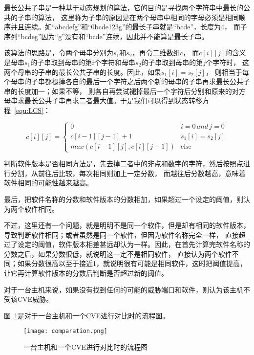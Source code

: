 最长公共子串是一种基于动态规划的算法，它的目的是寻找两个字符串中最长的公共的子串的算法，
这里称为子串的原因是在两个母串中相同的字母必须是相同顺序并且连续。如“abcdefg”和“0bcde123g”的最长子串就是“bcde”，长度为4，
而子序列“bcdeg”因为“g”没有和“bcde”连续，因此并不能算是最长子串。

该算法的思路是，令两个母串分别为$s_1$和$s_2$，再令二维数组$c$，
而$c[i][j]$的含义是母串$s_1$的子串取到母串的第$i$个字符和母串$s_2$的子串取到母串的第$j$个字符时，
这两个母串的子串的最长公共子串的长度。因此，如果$s_1 [i]=s_2 [j]$，
则相当于每个母串的子串都褪掉各自的最后一个字符之后两个新的母串的子串再求最长公共子串的长度加一；如果不等，
则各自再尝试褪掉最后一个字符后分别和原来的对方母串求最长公共子串再求二者最大值。于是我们可以得到状态转移方程~\ref{equ:LCS}：

\begin{equation}
    \label{equ:LCS}
    c[i][j]=\begin{cases}
    0 & i=0 \, and \, j=0 \\
    c[i-1][j-1]+1 & s_1[i]=s_2[j] \\
    max(c[i-1][j], c[i][j-1]) & \text{else}
    \end{cases}
\end{equation}

判断软件版本是否相同方法是，先去掉二者中的非点和数字的字符，然后按照点进行分割，从前往后比较，每次相同则加上一定分数，
而越往后分数越高，意味着软件相同的可能性越来越高。

最后，把软件名称的分数和软件版本的分数相加，如果超过一个设定的阈值，则认为两个软件相同。

不过，这里还有一个问题，就是明明不是同一个软件，但是却有相同的软件版本，导致判断软件相同；或者虽然是同一个软件，但因为软件名称完全一样，
直接超过了设定的阈值，软件版本相差甚远却认为一样。因此，在首先计算完软件名称的分数之后，如果分数很低，就说明这一定不是相同软件，
直接认为两个软件不同；如果分数很高以至于接近1，就说明很有可能是相同软件，这时把阈值提高，让它再计算软件版本的分数后判断是否超过新的阈值。

对于一台主机来说，如果没有找到任何的可能的威胁端口和软件，则认为该主机不受该CVE威胁。

图~\ref{fig:comparation}是对于一台主机和一个CVE进行对比时的流程图。

\begin{figure}[H]
    \centering
    \texttt{[image: comparation.png]}
    \caption{一台主机和一个CVE进行对比时的流程图}
    \label{fig:comparation}
\end{figure}

